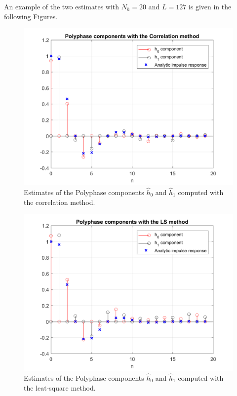 \documentclass[a4paper, 12pt]{report}
\begin{document}
An example of the two estimates with $N_h=20$ and $L=127$ is given in the following Figures.

\begin{figure}[H]
	\centering
	\includegraphics[width=14cm]{images/h_corr}
	\caption{Estimates of the Polyphase components $\hat{h}_0$ and $\hat{h}_1$ computed with the correlation method.}\label{h_cor}
\end{figure}
\begin{figure}[H]
	\centering
	\includegraphics[width=14cm]{images/h_ls}
	\caption{Estimates of the Polyphase components $\hat{h}_0$ and $\hat{h}_1$ computed with the leat-square method.}\label{h_ls}
\end{figure}
\end{document}
